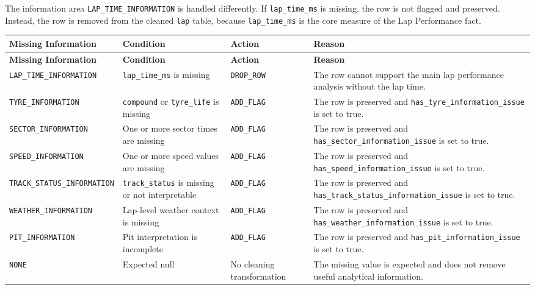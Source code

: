 \documentclass[a4paper,11pt]{article}
\newcommand{\codebreak}[1]{\nolinkurl{#1}}
\begin{document}
	The information area \texttt{LAP\_TIME\_INFORMATION} is handled differently.
	If \texttt{lap\_time\_ms} is missing, the row is not flagged and preserved.
	Instead, the row is removed from the cleaned \texttt{lap} table, because
	\texttt{lap\_time\_ms} is the core measure of the Lap Performance fact.
	
	\begin{longtable}{p{3.5cm}p{4cm}p{2.3cm}p{4.4cm}}
		\toprule
		\textbf{Missing Information} & \textbf{Condition} & \textbf{Action} & \textbf{Reason} \\
		\midrule
		\endfirsthead
		
		\toprule
		\textbf{Missing Information} & \textbf{Condition} & \textbf{Action} & \textbf{Reason} \\
		\midrule
		\endhead
		
		\codebreak{LAP_TIME_INFORMATION}
		& \texttt{lap\_time\_ms} is missing
		& \texttt{DROP\_ROW}
		& The row cannot support the main lap performance analysis without the lap time. \\
		\midrule
		
		\codebreak{TYRE_INFORMATION}
		& \texttt{compound} or \texttt{tyre\_life} is missing
		& \texttt{ADD\_FLAG}
		& The row is preserved and \texttt{has\_tyre\_information\_issue} is set to true. \\
		\midrule
		
		\codebreak{SECTOR_INFORMATION}
		& One or more sector times are missing
		& \texttt{ADD\_FLAG}
		& The row is preserved and \texttt{has\_sector\_information\_issue} is set to true. \\
		\midrule
		
		\codebreak{SPEED_INFORMATION}
		& One or more speed values are missing
		& \texttt{ADD\_FLAG}
		& The row is preserved and \texttt{has\_speed\_information\_issue} is set to true. \\
		\midrule
		
		\codebreak{TRACK_STATUS_INFORMATION}
		& \texttt{track\_status} is missing or not interpretable
		& \texttt{ADD\_FLAG}
		& The row is preserved and \texttt{has\_track\_status\_information\_issue} is set to true. \\
		\midrule
		
		\codebreak{WEATHER_INFORMATION}
		& Lap-level weather context is missing
		& \texttt{ADD\_FLAG}
		& The row is preserved and \texttt{has\_weather\_information\_issue} is set to true. \\
		\midrule
		
		\codebreak{PIT_INFORMATION}
		& Pit interpretation is incomplete
		& \texttt{ADD\_FLAG}
		& The row is preserved and \texttt{has\_pit\_information\_issue} is set to true. \\
		\midrule
		
		\texttt{NONE}
		& Expected null
		& No cleaning transformation
		& The missing value is expected and does not remove useful analytical information. \\
		\bottomrule
	\end{longtable}
	
\end{document}
